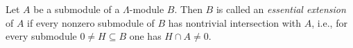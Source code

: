 Let $A$ be a submodule of a $\Lambda$-module $B$. Then $B$ is called an \emph{essential extension} of $A$ if every nonzero submodule of $B$ has nontrivial intersection with $A$, i.e., for every submodule $0 \neq H \subseteq B$ one has $H \cap A \neq 0$.
